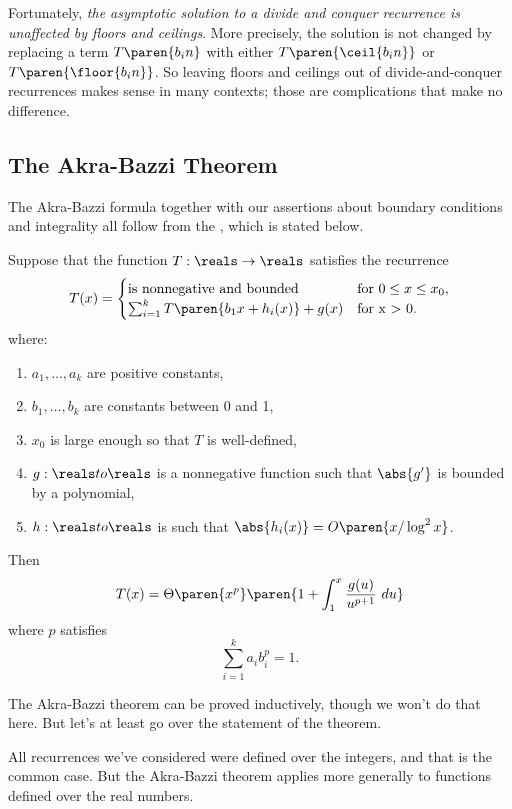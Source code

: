 Fortunately, \emph{the asymptotic solution to a divide and conquer
  recurrence is unaffected by floors and ceilings}.  More precisely,
the solution is not changed by replacing a term $T\paren{b_i n}$ with
either $T\paren{\ceil{b_i n}}$ or $T\paren{\floor{b_i n}}$.  So
leaving floors and ceilings out of divide-and-conquer recurrences
makes sense in many contexts; those are complications that make no
difference.

\subsection{The Akra-Bazzi Theorem}

The Akra-Bazzi formula together with our assertions about boundary
conditions and integrality all follow from the , which is stated below.

\begin{theorem}
\label{th:akra-bazzi}
Suppose that the function $T: \reals \to \reals$ satisfies
the recurrence
\[
T(x) =
\begin{cases}
\text{is nonnegative and bounded} & \text{for $0 \leq x \leq x_0$}, \\
\sum_{i=1}^k T\paren{b_1x + h_i(x)} + g(x) & \text{for x > 0}.
\end{cases}
\]
where:
\begin{enumerate}
\item $a_1, \dots, a_k$ are positive constants,
\item $b_1, \dots, b_k$ are constants between 0 and 1,
\item $x_0$ is large enough so that $T$ is well-defined,
\item $g:\reals to \reals$ is a nonnegative function such that $\abs{g'}$ is
  bounded by a polynomial,
\item $h:\reals to \reals$ is such that $\abs{h_i(x)} = O\paren{x / \log^2 x}$.
\end{enumerate}
Then
\[
T(x) = \Theta\paren{x^p }\paren{1 + \int_1^x \frac{g(u)}{u^{p+1}} \ du}
\]
where $p$ satisfies
\begin{equation*}
\sum_{i=1}^k {a_i b_i^p} = 1.
\end{equation*}
\end{theorem}

The Akra-Bazzi theorem can be proved inductively, though we won't do
that here.  But let's at least go over the statement of the theorem.

All recurrences we've considered were defined over the integers, and
that is the common case.  But the Akra-Bazzi theorem applies more
generally to functions defined over the real numbers.

